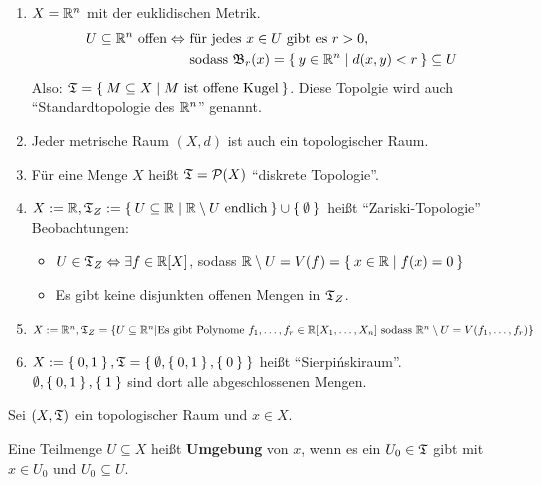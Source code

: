 \begin{beispiel}
    \begin{enumerate}[label=\arabic*)]
        \item $X = \mathbb{R}^n$ mit der euklidischen Metrik. 
              \begin{align*}
                U \subseteq \mathbb{R}^n \text{ offen} \Leftrightarrow &\text{ für jedes } x \in U \text{ gibt es } r > 0,\\
                                                      &\text{ sodass } \mathfrak{B}_r(x) = \Set{y \in \ensuremath{\mathbb{R}}^n | d(x,y) < r} \subseteq U
              \end{align*}
              Also: $\mathfrak{T} = \Set{M \subseteq X | M \text{ ist offene Kugel}}$. 
              Diese Topolgie wird auch \enquote{Standardtopologie des $\mathbb{R}^n$} genannt.
        \item Jeder metrische Raum $(X, d)$ ist auch ein topologischer Raum.
        \item Für eine Menge $X$ heißt $\mathfrak{T} = \mathcal{P}(X)$ \enquote{diskrete Topologie}.
        \item $X :=\mathbb{R}, \mathfrak{T}_Z := \Set{U \subseteq \ensuremath{\mathbb{R}}| \ensuremath{\mathbb{R}}\setminus U \text{ endlich}} \cup \Set{\emptyset}$ heißt \enquote{Zariski-Topologie} \\
              Beobachtungen: 
            \begin{itemize}
                \item $U \in \mathfrak{T}_Z \Leftrightarrow \exists f \in \mathbb{R}[X]$, sodass $\mathbb{R} \setminus U = V(f) = \Set{x \in \ensuremath{\mathbb{R}}| f(x) = 0}$
                \item Es gibt keine disjunkten offenen Mengen in $\mathfrak{T}_Z$.
            \end{itemize}
        \item $X := \mathbb{R}^n, \mathfrak{T}_Z = \{U \subseteq \mathbb{R}^n | \text{Es gibt Polynome } f_1, \dots, f_r \in \mathbb{R}[X_1, \dots, X_n] \text{ sodass }\\\mathbb{R}^n \setminus U = V(f_1, \dots, f_r)\}$
        \item $X := \Set{0,1}, \mathfrak{T} = \Set{\emptyset, \Set{0,1}, \Set{0}}$ heißt \enquote{Sierpińskiraum}.\\
              $\emptyset, \Set{0,1}, \Set{1}$ sind dort alle abgeschlossenen Mengen.
    \end{enumerate}
\end{beispiel}

\begin{definition} 
    Sei $(X, \mathfrak{T})$ ein topologischer Raum und $x \in X$.

    Eine Teilmenge $U \subseteq X$ heißt \textbf{Umgebung} von $x$,
    wenn es ein $U_0 \in \mathfrak{T}$ gibt mit $x \in U_0$ und $U_0 \subseteq U$.
\end{definition}

